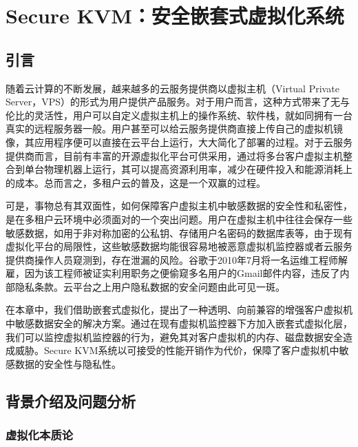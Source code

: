 
\chapter{Secure KVM：安全嵌套式虚拟化系统}
\label{chap:securekvm}



\section{引言}

随着云计算的不断发展，越来越多的云服务提供商以虚拟主机（Virtual Private Server，VPS）的形式为用户提供产品服务\cite{beloussov2008virtual}。对于用户而言，这种方式带来了无与伦比的灵活性，用户可以自定义虚拟主机上的操作系统、软件栈，就如同拥有一台真实的远程服务器一般。用户甚至可以给云服务提供商直接上传自己的虚拟机镜像，其应用程序便可以直接在云平台上运行，大大简化了部署的过程。对于云服务提供商而言，目前有丰富的开源虚拟化平台可供采用\cite{barham2003xen}\cite{kivity2007kvm}，通过将多台客户虚拟主机整合到单台物理机器上运行，其可以提高资源利用率，减少在硬件投入和能源消耗上的成本。总而言之，多租户云的普及，这是一个双赢的过程。

可是，事物总有其双面性，如何保障客户虚拟主机中敏感数据的安全性和私密性，是在多租户云环境中必须面对的一个突出问题\cite{zhang2011cloudvisor}。用户在虚拟主机中往往会保存一些敏感数据，如用于非对称加密的公私钥、存储用户名密码的数据库表等，由于现有虚拟化平台的局限性，这些敏感数据均能很容易地被恶意虚拟机监控器或者云服务提供商操作人员窥测到，存在泄漏的风险\cite{kandukuri2009cloud}。谷歌于2010年7月将一名运维工程师解雇，因为该工程师被证实利用职务之便偷窥多名用户的Gmail邮件内容，违反了内部隐私条款。云平台之上用户隐私数据的安全问题由此可见一斑\cite{gmailprivacy}。

在本章中，我们借助嵌套式虚拟化\cite{ben2010turtles}，提出了一种透明、向前兼容的增强客户虚拟机中敏感数据安全的解决方案。通过在现有虚拟机监控器下方加入嵌套式虚拟化层，我们可以监控虚拟机监控器的行为，避免其对客户虚拟机的内存、磁盘数据安全造成威胁。Secure KVM系统以可接受的性能开销作为代价，保障了客户虚拟机中敏感数据的安全性与隐私性。

\section{背景介绍及问题分析}

\subsection{虚拟化本质论}

